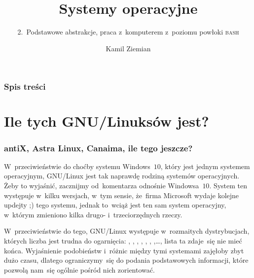 \documentclass[10pt,t]{beamer}
\title{Systemy operacyjne}
\subtitle{2.~Podstawowe abstrakcje, praca z~komputerem
  z~poziomu powłoki \textsc{bash}}
\author{Kamil Ziemian \\
  \email}
\begin{document}





\RaggedRight





\maketitle





\begin{frame}
  \frametitle{Spis treści}


  \tableofcontents

\end{frame}










\section{Ile tych GNU/Linuksów jest?}


\begin{frame}
  \frametitle{antiX, Astra Linux, Canaima, ile tego jeszcze?}


  W~przeciwieństwie do choćby systemu Windows~$10$, który jest jednym
  systemem operacyjnym, GNU/Linux jest tak naprawdę \alert{rodziną systemów}
  operacyjnych. Żeby to wyjaśnić, zacznijmy od~komentarza odnośnie
  Windowsa~$10$. System ten występuje w~kilku wersjach, w~tym sensie,
  że~firma Microsoft wydaje kolejne updejty ;) tego systemu, jednak to~wciąż
  jest ten sam system operacyjny, w~którym zmieniono kilka drugo-
  i~trzeciorzędnych rzeczy.

  W~przeciwieństwie do tego, GNU/Linux występuje w~rozmaitych
  \alert{dystrybucjach}, których liczba jest trudna do ogarnięcia:
  ,
  ,
  ,
  ,
  ,
  ,
  ,\ldots, lista ta zdaje~się
  nie mieć końca. Wyjaśnienie podobieństw i~różnic między tymi systemami
  zajęłoby zbyt dużo czasu, dlatego ograniczymy~się do podania
  podstawowych informacji, które pozwolą nam~się ogólnie pośród nich
  zorientować.

\end{frame}
\end{document}
